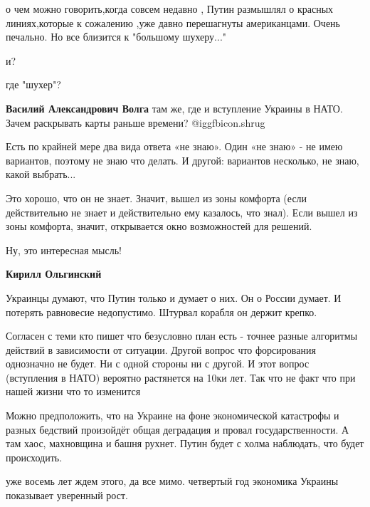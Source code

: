 \begin{itemize}
о чем можно говорить,когда совсем недавно , Путин размышлял о красных
линиях,которые к сожалению ,уже давно перешагнуты американцами. Очень печально.
Но все близится к "большому шухеру..."

\begin{itemize} %
и?

где "шухер"?

\textbf{Василий Александрович Волга} там же, где и вступление Украины в НАТО. Зачем раскрывать карты раньше времени? @igg{fbicon.shrug} 
\end{itemize} %


Есть по крайней мере два вида ответа «не знаю». Один «не знаю» - не имею
вариантов, поэтому не знаю что делать. И другой: вариантов несколько, не знаю,
какой выбрать...


Это хорошо, что он не знает. Значит, вышел из зоны комфорта (если действительно
не знает и действительно ему казалось, что знал). Если вышел из зоны комфорта,
значит, открывается окно возможностей для решений.

\begin{itemize} %
Ну, это интересная мысль!

\textbf{Кирилл Ольгинский} 

Украинцы думают, что Путин только и думает о них. Он о России думает. И
потерять равновесие недопустимо. Штурвал корабля он держит крепко.

\end{itemize} %


Согласен с теми кто пишет что безусловно план есть - точнее разные алгоритмы
действий в зависимости от ситуации. Другой вопрос что форсирования однозначно
не будет. Ни с одной стороны ни с другой. И этот вопрос (вступления в НАТО)
вероятно растянется на 10ки лет. Так что не факт что при нашей жизни что то
изменится


Можно предположить, что на Украине на фоне экономической катастрофы и разных
бедствий произойдёт общая деградация и провал государственности. А там хаос,
махновщина и башня рухнет. Путин будет с холма наблюдать, что будет
происходить.

\begin{itemize} %
уже восемь лет ждем этого, да все мимо. четвертый год экономика Украины показывает уверенный рост.
\end{itemize} %


\end{itemize}
